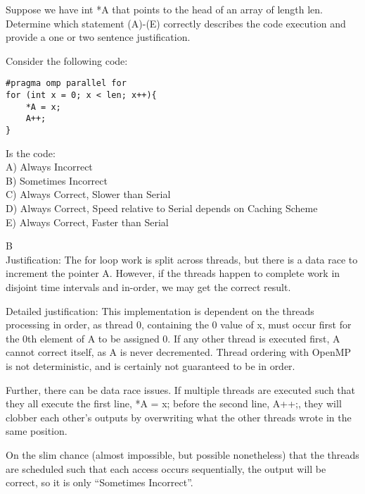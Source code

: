 \begin{blocksection}
\question
Suppose we have int *A that points to the head of an array of length len. 
Determine which statement (A)-(E) correctly describes the code execution and provide a one or two sentence justification.

Consider the following code:
\begin{verbatim}
#pragma omp parallel for
for (int x = 0; x < len; x++){
    *A = x; 
    A++;
}
\end{verbatim}
Is the code: \\
A) Always Incorrect \\
B) Sometimes Incorrect \\ 
C) Always Correct, Slower than Serial \\
D) Always Correct, Speed relative to Serial depends on Caching Scheme \\
E) Always Correct, Faster than Serial \\

\begin{solution}[0.5in]
B \\
Justification:
The for loop work is split across threads, but there is a data race to increment the pointer A. However, if the threads happen to complete work in disjoint time intervals and in-order, we may get the correct result. 

Detailed justification:
This implementation is dependent on the threads processing in order, as thread 0, containing the 0 value of x, must occur first for the 0th element of A to be assigned 0. If any other thread is executed first, A cannot correct itself, as A is never decremented.
Thread ordering with OpenMP is not deterministic, and is certainly not guaranteed to be in order.

Further, there can be data race issues. If multiple threads are executed such that they all execute the first line, *A = x; before the second line, A++;, they will clobber each other’s outputs by overwriting what the other threads wrote in the same position.

On the slim chance (almost impossible, but possible nonetheless) that the threads are scheduled such that each access occurs sequentially, the output will be correct, so it is only “Sometimes Incorrect”.
\end{solution}

\end{blocksection}